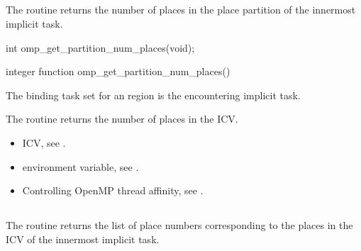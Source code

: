 \subsection{}
\label{subsec:omp_get_partition_num_places}

\summary
The  routine returns the number of places in the place partition of the innermost implicit task.

\format
\ccppspecificstart
\begin{boxedcode}
int omp\_get\_partition\_num\_places(void);
\end{boxedcode}
\ccppspecificend

\fortranspecificstart
\begin{boxedcode}
integer function omp\_get\_partition\_num\_places()
\end{boxedcode}
\fortranspecificend

\binding
The binding task set for an   region is the encountering implicit task.

\effect
The  routine returns the number of places in the  ICV.

\crossreferences
\begin{itemize}
\item {} ICV, see 
.

\item {} environment variable, see 
.

\item Controlling OpenMP thread affinity, see 
. 
\end{itemize}





\subsection{}
\label{subsec:omp_get_partition_place_nums}

\summary
The  routine returns the list of place numbers corresponding to the places in the  ICV of the innermost implicit task.

